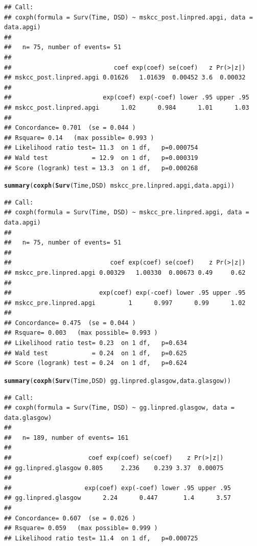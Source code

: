 \documentclass{article}\usepackage[]{graphicx}\usepackage[]{color}
\makeatletter
\newcommand{\hlopt}[1]{\textcolor[rgb]{0,0,0}{#1}}%
\newcommand{\hlstd}[1]{\textcolor[rgb]{0.345,0.345,0.345}{#1}}%
\newcommand{\hlkwd}[1]{\textcolor[rgb]{0.737,0.353,0.396}{\textbf{#1}}}%
\newenvironment{kframe}{%
 \def\at@end@of@kframe{}%
 \ifinner\ifhmode%
  \def\at@end@of@kframe{\end{minipage}}%
  \begin{minipage}{\columnwidth}%
 \fi\fi%
 \def\FrameCommand##1{\hskip\@totalleftmargin \hskip-\fboxsep
 \colorbox{shadecolor}{##1}\hskip-\fboxsep
     \hskip-\linewidth \hskip-\@totalleftmargin \hskip\columnwidth}%
 \MakeFramed {\advance\hsize-\width
   \@totalleftmargin\z@ \linewidth\hsize
   \@setminipage}}%
 {\par\unskip\endMakeFramed%
 \at@end@of@kframe}
\newenvironment{knitrout}{}{} %
\makeatother
\begin{document}
\begin{knitrout}
\begin{kframe}
\begin{alltt}
\end{alltt}
\begin{verbatim}
## Call:
## coxph(formula = Surv(Time, DSD) ~ mskcc_post.linpred.apgi, data = data.apgi)
## 
##   n= 75, number of events= 51 
## 
##                            coef exp(coef) se(coef)   z Pr(>|z|)
## mskcc_post.linpred.apgi 0.01626   1.01639  0.00452 3.6  0.00032
## 
##                         exp(coef) exp(-coef) lower .95 upper .95
## mskcc_post.linpred.apgi      1.02      0.984      1.01      1.03
## 
## Concordance= 0.701  (se = 0.044 )
## Rsquare= 0.14   (max possible= 0.993 )
## Likelihood ratio test= 11.3  on 1 df,   p=0.000754
## Wald test            = 12.9  on 1 df,   p=0.000319
## Score (logrank) test = 13.3  on 1 df,   p=0.000268
\end{verbatim}
\begin{alltt}
\hlkwd{summary}\hlstd{(}\hlkwd{coxph}\hlstd{(}\hlkwd{Surv}\hlstd{(Time, DSD)} \hlopt{~} \hlstd{mskcc_pre.linpred.apgi, data.apgi))}
\end{alltt}
\begin{verbatim}
## Call:
## coxph(formula = Surv(Time, DSD) ~ mskcc_pre.linpred.apgi, data = data.apgi)
## 
##   n= 75, number of events= 51 
## 
##                           coef exp(coef) se(coef)    z Pr(>|z|)
## mskcc_pre.linpred.apgi 0.00329   1.00330  0.00673 0.49     0.62
## 
##                        exp(coef) exp(-coef) lower .95 upper .95
## mskcc_pre.linpred.apgi         1      0.997      0.99      1.02
## 
## Concordance= 0.475  (se = 0.044 )
## Rsquare= 0.003   (max possible= 0.993 )
## Likelihood ratio test= 0.23  on 1 df,   p=0.634
## Wald test            = 0.24  on 1 df,   p=0.625
## Score (logrank) test = 0.24  on 1 df,   p=0.624
\end{verbatim}
\begin{alltt}
\hlkwd{summary}\hlstd{(}\hlkwd{coxph}\hlstd{(}\hlkwd{Surv}\hlstd{(Time, DSD)} \hlopt{~} \hlstd{gg.linpred.glasgow, data.glasgow))}
\end{alltt}
\begin{verbatim}
## Call:
## coxph(formula = Surv(Time, DSD) ~ gg.linpred.glasgow, data = data.glasgow)
## 
##   n= 189, number of events= 161 
## 
##                     coef exp(coef) se(coef)    z Pr(>|z|)
## gg.linpred.glasgow 0.805     2.236    0.239 3.37  0.00075
## 
##                    exp(coef) exp(-coef) lower .95 upper .95
## gg.linpred.glasgow      2.24      0.447       1.4      3.57
## 
## Concordance= 0.607  (se = 0.026 )
## Rsquare= 0.059   (max possible= 0.999 )
## Likelihood ratio test= 11.4  on 1 df,   p=0.000725

\end{verbatim}
\end{kframe}
\end{knitrout}
\end{document}
